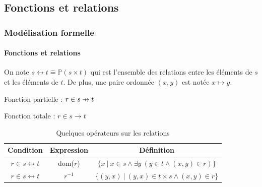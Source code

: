 \documentclass[11pt,a4paper,xcolor=table, handout]{beamer} %
\newcommand{\Bequal}{\mathrel{\widehat{=}}}
\def\p#1{\mathrel{\ooalign{\hfil$\mapstochar\mkern 5mu$\hfil\cr$#1$}}}
\def \pfun  {\p\rightarrow}
\begin{document}
\subsection{Fonctions et relations}
\begin{frame}
\frametitle{Modélisation formelle}
\framesubtitle{Fonctions et relations}
On note  $ s \leftrightarrow t \Bequal \mathbb{P}(s \times t)$ qui est l'ensemble des relations entre les éléments de $s$ et les éléments de $t$. De plus, une paire ordonnée $(x, y)$ est notée $x \mapsto y$.

Fonction partielle : $r \in s \pfun t$

Fonction totale :  $r \in s \rightarrow t$ 
\pause
{\arraycolsep=1.4pt
\renewcommand{\arraystretch}{2}
\begin{table}
\centering
\begin{tabular}[h]{|c | c | c|}
\hline
\bf Condition & \bf Expression &  \bf Définition \tabularnewline
\hline 
$r \in s \leftrightarrow t$ & dom($r$) & $\{ x~|~x\in s \wedge \exists y~(y \in t \wedge (x, y)  \in r)\}$  \tabularnewline
$r \in s \leftrightarrow t$ & $r^{-1}$ & $\{(y, x)~|~(y, x) \in t \times s \wedge (x, y) \in r\}$ \tabularnewline
\hline
\end{tabular}
\caption{Quelques opérateurs sur les relations}
\end{table}
}

\end{frame}

\end{document}
